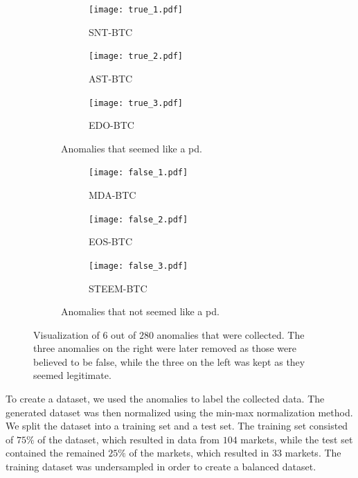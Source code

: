 \begin{figure}[hbt!]
    \centering
    \begin{subfigure}{.49\textwidth}
        \centering
        \begin{subfigure}{\textwidth}
            \texttt{[image: true\_1.pdf]}
            \caption*{SNT-BTC}
        \end{subfigure}
        \begin{subfigure}{\textwidth}
            \texttt{[image: true\_2.pdf]}
            \caption*{AST-BTC}
        \end{subfigure}
        \begin{subfigure}{\textwidth}
            \texttt{[image: true\_3.pdf]}
            \caption*{EDO-BTC}
        \end{subfigure}
        \caption{Anomalies that seemed like a \ac{pd}.}
        \label{fig:label_true}
    \end{subfigure}
    \hfill
    \begin{subfigure}{.49\textwidth}
        \centering
        \begin{subfigure}{\textwidth}
            \texttt{[image: false\_1.pdf]}
            \caption*{MDA-BTC}
        \end{subfigure}
        \begin{subfigure}{\textwidth}
            \texttt{[image: false\_2.pdf]}
            \caption*{EOS-BTC}
        \end{subfigure}
        \begin{subfigure}{\textwidth}
            \texttt{[image: false\_3.pdf]}
            \caption*{STEEM-BTC}
        \end{subfigure}
        \caption{Anomalies that not seemed like a \ac{pd}.}
        \label{fig:label_false}    
    \end{subfigure}
    \caption[Visualization of anomalies in the dataset]{Visualization of $6$ out of $280$ anomalies that were collected. The three anomalies on the right were later removed as those were believed to be false, while the three on the left was kept as they seemed legitimate.}
\end{figure}

To create a dataset, we used the anomalies to label the collected data. The generated dataset was then normalized using the min-max normalization method. We split the dataset into a training set and a test set. The training set consisted of $75\%$ of the dataset, which resulted in data from $104$ markets, while the test set contained the remained $25\%$ of the markets, which resulted in $33$ markets. The training dataset was undersampled in order to create a balanced dataset.

